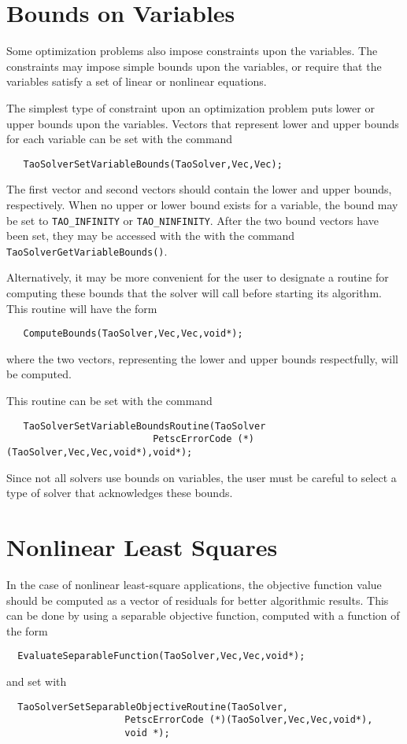 \section{Bounds on Variables}\label{sec:bounds}

Some optimization problems also impose constraints upon the variables.
The constraints may impose simple bounds upon the variables, or
require that the variables satisfy a set of linear or  nonlinear equations.

The simplest type of constraint upon an optimization problem puts lower
or upper bounds upon the variables. 
Vectors that represent lower and upper bounds for each variable 
can be set with the command  
\begin{verbatim}
   TaoSolverSetVariableBounds(TaoSolver,Vec,Vec);
\end{verbatim}
\noindent
The first vector and second vectors should contain the lower and upper 
bounds, respectively.
When no upper or lower bound exists for a variable, the bound
may be set to {\tt TAO\_INFINITY} or {\tt TAO\_NINFINITY}.
After the two bound vectors have been set, they may be accessed with the
with the command  {\tt TaoSolverGetVariableBounds()}.

Alternatively, it may be more convenient for the user to designate a routine 
for computing these bounds
that the solver will call before starting its algorithm.  This routine will
have the form
\begin{verbatim}
   ComputeBounds(TaoSolver,Vec,Vec,void*);
\end{verbatim}
where the two vectors, representing the lower and upper bounds respectfully, 
will be computed.

This routine can be set with the command
\begin{verbatim}
   TaoSolverSetVariableBoundsRoutine(TaoSolver
                          PetscErrorCode (*)(TaoSolver,Vec,Vec,void*),void*);
\end{verbatim}
   
Since not all solvers use bounds on variables, the user must be careful 
to select a type of solver that acknowledges these bounds.

\section{Nonlinear Least Squares}
In the case of nonlinear least-square applications, the objective function
value should be computed as a vector of residuals for better algorithmic 
results.  This can be done by using a separable objective function, computed
with a function of the form
\begin{verbatim}
  EvaluateSeparableFunction(TaoSolver,Vec,Vec,void*);
\end{verbatim}
and set with
\begin{verbatim}
  TaoSolverSetSeparableObjectiveRoutine(TaoSolver,
                     PetscErrorCode (*)(TaoSolver,Vec,Vec,void*),
                     void *);
\end{verbatim}


